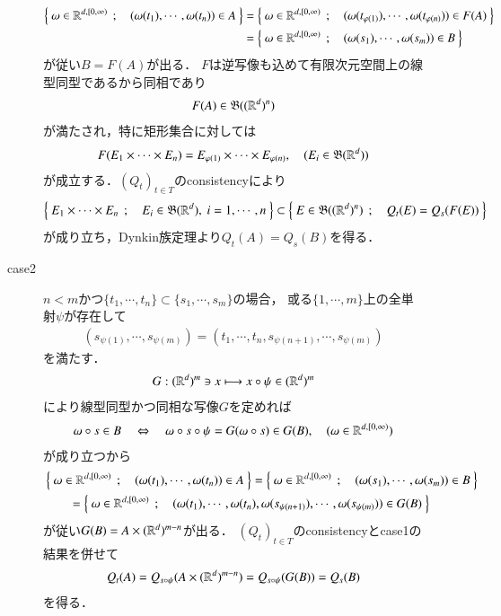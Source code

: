 \begin{prf}
\begin{description}
\begin{description}
						\begin{align}
							\left\{\ \omega \in \mathbb{R}^{d,[0,\infty)}\ \, ; \quad (\omega(t_1),\cdots,\omega(t_n)) \in A\ \right\}
							&= \left\{\ \omega \in \mathbb{R}^{d,[0,\infty)}\ \, ; \quad (\omega(t_{\varphi(1)}),\cdots,\omega(t_{\varphi(n)})) \in F(A)\ \right\} \\
							&= \left\{\ \omega \in \mathbb{R}^{d,[0,\infty)}\ \, ; \quad (\omega(s_1),\cdots,\omega(s_m)) \in B\ \right\} 
						\end{align}
						が従い$B = F(A)$が出る．
						$F$は逆写像も込めて有限次元空間上の線型同型であるから同相であり
						\begin{align}
							F(A) \in \mathfrak{B}((\mathbb{R}^d)^n)
						\end{align}
						が満たされ，特に矩形集合に対しては
						\begin{align}
							F(E_1 \times \cdots \times E_n) = E_{\varphi(1)} \times \cdots \times  E_{\varphi(n)},
							\quad (E_i \in \mathfrak{B}(\mathbb{R}^d))
						\end{align}
						が成立する．$(Q_t)_{t \in T}$のconsistencyにより
						\begin{align}
							\left\{\ E_1 \times \cdots \times E_n\ \, ; \quad E_i \in \mathfrak{B}(\mathbb{R}^d),\ i=1,\cdots,n\ \right\}
							\subset \left\{\ E \in \mathfrak{B}((\mathbb{R}^d)^n)\ \, ; \quad Q_t(E) = Q_s(F(E))\ \right\}
						\end{align}
						が成り立ち，Dynkin族定理より$Q_t(A) = Q_s (B)$を得る．
					
					\item[case2]
						$n < m$かつ$\{t_1,\cdots,t_n\} \subset \{s_1,\cdots,s_m\}$の場合，
						或る$\{1,\cdots,m\}$上の全単射$\psi$が存在して
						\begin{align}
							(s_{\psi(1)},\cdots, s_{\psi(m)})
							= (t_1, \cdots, t_n,s_{\psi(n+1)},\cdots,s_{\psi(m)})
						\end{align}
						を満たす．
						\begin{align}
							G:(\mathbb{R}^d)^m \ni x \longmapsto x \circ \psi \in (\mathbb{R}^d)^m
						\end{align}
						により線型同型かつ同相な写像$G$を定めれば
						\begin{align}
							\omega \circ s \in B
							\quad \Leftrightarrow \quad \omega \circ s \circ \psi 
							= G(\omega \circ s) \in G(B),
							\quad (\omega \in \mathbb{R}^{d,[0,\infty)})
						\end{align}
						が成り立つから
						\begin{align}
							&\left\{\ \omega \in \mathbb{R}^{d,[0,\infty)}\ \, ; \quad (\omega(t_1),\cdots,\omega(t_n)) \in A\ \right\}
							= \left\{\ \omega \in \mathbb{R}^{d,[0,\infty)}\ \, ; \quad (\omega(s_1),\cdots,\omega(s_m)) \in B\ \right\} \\
							&\qquad= \left\{\ \omega \in \mathbb{R}^{d,[0,\infty)}\ \, ; \quad (\omega(t_1),\cdots,\omega(t_n),\omega(s_{\psi(n+1)}),\cdots,\omega(s_{\psi(m)})) \in G(B)\ \right\} 
						\end{align}
						が従い$G(B) = A \times (\mathbb{R}^d)^{m-n}$が出る．
						$(Q_t)_{t \in T}$のconsistencyとcase1の結果を併せて
						\begin{align}
							Q_t(A) = Q_{s \circ \psi}(A \times (\mathbb{R}^d)^{m-n}) = Q_{s \circ \psi}(G(B))
							= Q_s(B)
						\end{align}
						を得る．
						

\end{description}
\end{description}
\end{prf}

